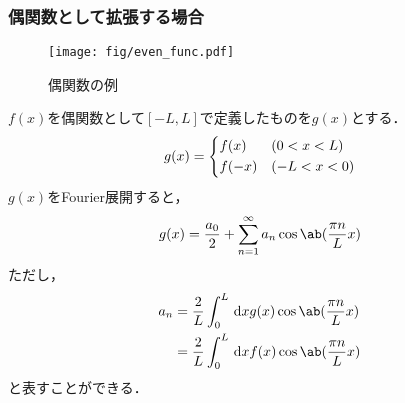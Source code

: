 \subsubsection{偶関数として拡張する場合}
\begin{wrapfigure}{r}{0.3\linewidth}
  \centering
  \texttt{[image: fig/even\_func.pdf]}  
  \caption{偶関数の例}
\end{wrapfigure}
$f(x)$を偶関数として$[-L, L]$で定義したものを$g(x)$とする．
\begin{gather}  
  g(x) = 
  \begin{dcases}
    f(x) & (0 < x < L)\\
    f(-x) & (-L<x<0)
  \end{dcases}
\end{gather}
$g(x)$をFourier展開すると，
\begin{gather}
  g(x) = \frac{a_0}{2} + \sum_{n=1}^\infty a_n \cos\ab(\frac{\pi n}{L}x)
\end{gather}
ただし，
\begin{align}  
  a_n &= \frac{2}{L} \int_0^L \dl{x} g(x) \cos\ab(\frac{\pi n}{L} x)\\
      &= \frac{2}{L} \int_0^L \dl{x} f(x) \cos\ab(\frac{\pi n}{L} x)
\end{align}
と表すことができる．





